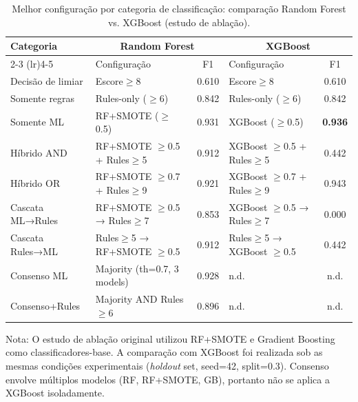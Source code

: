 \begin{table}[htbp]
\centering
\caption{Melhor configuração por categoria de classificação: comparação Random Forest vs. XGBoost (estudo de ablação).}
\label{tab:ablation-best-category}
\footnotesize
\begin{tabular}{p{3cm}p{3.2cm}cp{3.2cm}c}
\toprule
\multirow{2}{*}{Categoria} & \multicolumn{2}{c}{Random Forest} & \multicolumn{2}{c}{XGBoost} \\
\cmidrule(lr){2-3} \cmidrule(lr){4-5}
 & Configuração & F1 & Configuração & F1 \\
\midrule
Decis\~ao de limiar & Escore$\geq$8 & 0.610 & Escore$\geq$8 & 0.610 \\
Somente regras & Rules-only ($\geq$6) & 0.842 & Rules-only ($\geq$6) & 0.842 \\
Somente ML & RF+SMOTE ($\geq$0.5) & 0.931 & XGBoost ($\geq$0.5) & \textbf{0.936} \\
Híbrido AND & RF+SMOTE $\geq$0.5 + Rules$\geq$5 & 0.912 & XGBoost $\geq$0.5 + Rules$\geq$5 & 0.442 \\
Híbrido OR & RF+SMOTE $\geq$0.7 + Rules$\geq$9 & 0.921 & XGBoost $\geq$0.7 + Rules$\geq$9 & 0.943 \\
Cascata ML→Rules & RF+SMOTE $\geq$0.5 → Rules$\geq$7 & 0.853 & XGBoost $\geq$0.5 → Rules$\geq$7 & 0.000 \\
Cascata Rules→ML & Rules$\geq$5 → RF+SMOTE $\geq$0.5 & 0.912 & Rules$\geq$5 → XGBoost $\geq$0.5 & 0.442 \\
Consenso ML & Majority (th=0.7, 3 models) & 0.928 & n.d. & n.d. \\
Consenso+Rules & Majority AND Rules$\geq$6 & 0.896 & n.d. & n.d. \\
\bottomrule
\end{tabular}
\begin{tablenotes}
\small
\item Nota: O estudo de abla\c{c}\~ao original utilizou RF+SMOTE e Gradient Boosting como classificadores-base. A comparação com XGBoost foi realizada sob as mesmas condi\c{c}\~oes experimentais (\textit{holdout} set, seed=42, split=0.3). Consenso envolve m\'ultiplos modelos (RF, RF+SMOTE, GB), portanto não se aplica a XGBoost isoladamente.
\end{tablenotes}
\end{table}
